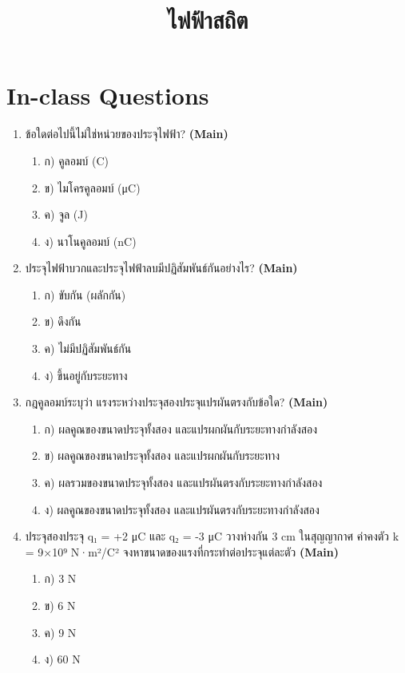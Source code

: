 \documentclass[12pt]{article}
\begin{document}
\title{ไฟฟ้าสถิต}
\maketitle
\section*{In-class Questions}
\begin{enumerate}[label=\arabic*.]
\item ข้อใดต่อไปนี้ไม่ใช่หน่วยของประจุไฟฟ้า? \hfill \textbf{\small (Main)}
\begin{enumerate}[label=)]
\item ก) คูลอมบ์ (C)
\item ข) ไมโครคูลอมบ์ (μC)
\item ค) จูล (J)
\item ง) นาโนคูลอมบ์ (nC)
\end{enumerate}
\item ประจุไฟฟ้าบวกและประจุไฟฟ้าลบมีปฏิสัมพันธ์กันอย่างไร? \hfill \textbf{\small (Main)}
\begin{enumerate}[label=)]
\item ก) ขับกัน (ผลักกัน)
\item ข) ดึงกัน
\item ค) ไม่มีปฏิสัมพันธ์กัน
\item ง) ขึ้นอยู่กับระยะทาง
\end{enumerate}
\item กฎคูลอมบ์ระบุว่า แรงระหว่างประจุสองประจุแปรผันตรงกับข้อใด? \hfill \textbf{\small (Main)}
\begin{enumerate}[label=)]
\item ก) ผลคูณของขนาดประจุทั้งสอง และแปรผกผันกับระยะทางกำลังสอง
\item ข) ผลคูณของขนาดประจุทั้งสอง และแปรผกผันกับระยะทาง
\item ค) ผลรวมของขนาดประจุทั้งสอง และแปรผันตรงกับระยะทางกำลังสอง
\item ง) ผลคูณของขนาดประจุทั้งสอง และแปรผันตรงกับระยะทางกำลังสอง
\end{enumerate}
\item ประจุสองประจุ q₁ = +2 μC และ q₂ = -3 μC วางห่างกัน 3 cm ในสุญญากาศ ค่าคงตัว k = 9×10⁹ N·m²/C² จงหาขนาดของแรงที่กระทำต่อประจุแต่ละตัว \hfill \textbf{\small (Main)}
\begin{enumerate}[label=)]
\item ก) 3 N
\item ข) 6 N
\item ค) 9 N
\item ง) 60 N

\end{enumerate}
\end{enumerate}
\end{document}
